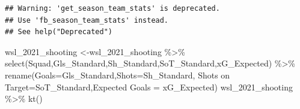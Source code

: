\documentclass[
  11pt,
]{book}
\newenvironment{Shaded}{\begin{snugshade}}{\end{snugshade}}
\newcommand{\AttributeTok}[1]{\textcolor[rgb]{0.77,0.63,0.00}{#1}}
\newcommand{\FunctionTok}[1]{\textcolor[rgb]{0.00,0.00,0.00}{#1}}
\newcommand{\NormalTok}[1]{#1}
\newcommand{\OtherTok}[1]{\textcolor[rgb]{0.56,0.35,0.01}{#1}}
\newcommand{\SpecialCharTok}[1]{\textcolor[rgb]{0.00,0.00,0.00}{#1}}
\newcommand{\StringTok}[1]{\textcolor[rgb]{0.31,0.60,0.02}{#1}}
\theoremstyle{definition}
\theoremstyle{definition}
\theoremstyle{definition}
\theoremstyle{definition}
\theoremstyle{remark}
\begin{document}
\begin{verbatim}
## Warning: 'get_season_team_stats' is deprecated.
## Use 'fb_season_team_stats' instead.
## See help("Deprecated")
\end{verbatim}

\begin{Shaded}
\begin{Highlighting}[]
\NormalTok{wsl\_2021\_shooting }\OtherTok{\textless{}{-}}\NormalTok{wsl\_2021\_shooting }\SpecialCharTok{\%\textgreater{}\%} 
  \FunctionTok{select}\NormalTok{(Squad,Gls\_Standard,Sh\_Standard,SoT\_Standard,xG\_Expected) }\SpecialCharTok{\%\textgreater{}\%} 
  \FunctionTok{rename}\NormalTok{(}\AttributeTok{Goals=}\NormalTok{Gls\_Standard,}\AttributeTok{Shots=}\NormalTok{Sh\_Standard,}
         \StringTok{\textasciigrave{}}\AttributeTok{Shots on Target}\StringTok{\textasciigrave{}}\OtherTok{=}\NormalTok{SoT\_Standard,}\StringTok{\textasciigrave{}}\AttributeTok{Expected Goals}\StringTok{\textasciigrave{}} \OtherTok{=}\NormalTok{ xG\_Expected)}
\NormalTok{wsl\_2021\_shooting }\SpecialCharTok{\%\textgreater{}\%} \FunctionTok{kt}\NormalTok{()}
\end{Highlighting}
\end{Shaded}
\end{document}
